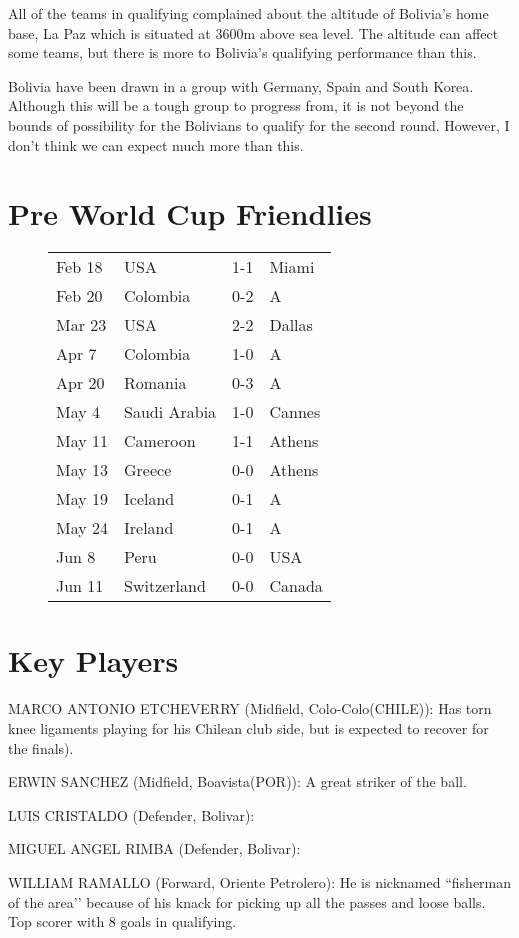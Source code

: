 All of the teams in qualifying complained about the altitude of Bolivia's home
base, La Paz which is situated at 3600m above sea level. The altitude can 
affect some teams, but there is more to Bolivia's qualifying performance than
this.

Bolivia have been drawn in a group with Germany, Spain and South Korea. Although
this will be a tough group to progress from, it is not beyond the bounds of
possibility for the Bolivians to qualify for the second round. However, I don't
think we can expect much more than this.
\section{Pre World Cup Friendlies}
\begin{figure}[H]
\begin{tabular}{l l c l}
Feb 18 & USA & 1-1 & Miami \\
Feb 20 & Colombia & 0-2 & A \\
Mar 23 & USA & 2-2 & Dallas \\
Apr 7 & Colombia & 1-0 & A \\
Apr 20 & Romania & 0-3 & A \\
May 4 & Saudi Arabia & 1-0 & Cannes \\
May 11 & Cameroon & 1-1 & Athens \\
May 13 & Greece & 0-0 & Athens \\
May 19 & Iceland & 0-1 & A \\
May 24 & Ireland & 0-1 & A \\
Jun 8 & Peru & 0-0 & USA \\
Jun 11 & Switzerland & 0-0 & Canada \\
\end{tabular}
\end{figure}
\section{Key Players}
MARCO ANTONIO ETCHEVERRY (Midfield, Colo-Colo(CHILE)):
Has torn knee ligaments playing for his Chilean club side, but is expected to
recover for the finals).

ERWIN SANCHEZ (Midfield, Boavista(POR)):
A great striker of the ball.

LUIS CRISTALDO (Defender, Bolivar):

MIGUEL ANGEL RIMBA (Defender, Bolivar):

WILLIAM RAMALLO (Forward, Oriente Petrolero):
He is nicknamed ``fisherman of the area’’ because of his knack for picking up
all the passes and loose balls. Top scorer with 8 goals in qualifying.
